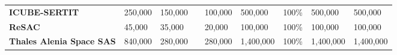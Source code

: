 \begin{table}[H]
{\begin{tabular}{p{5cm}p{2cm}p{2cm}p{2.5cm}p{2cm}p{2cm}p{2cm}p{2cm}p{2cm}}
\textbf{ICUBE-SERTIT}                                                                    & 250,000                                                                                               & 150,000                                                                                         &                                                                                                                & 100,000                                                                                    & 500,000                                                                                                    & 100\%                                                                                                & 500,000                                                                                             & 500,000                                                                                               \\
\textbf{ReSAC}                                                                           & 45,000                                                                                                & 35,000                                                                                          &                                                                                                                & 20,000                                                                                     & 100,000                                                                                                    & 100\%                                                                                                & 100,000                                                                                             & 100,000                                                                                               \\
\textbf{Thales Alenia Space SAS}             & 840,000                                                                                               & 280,000                                                                                         &                                                                                                                & 280,000                                                                                    & 1,400,000                                                                                                  & 100\%                                                                                                & 1,400,000                                                                                           & 1,400,000                                                                                             \\

\end{tabular}}
\end{table}
